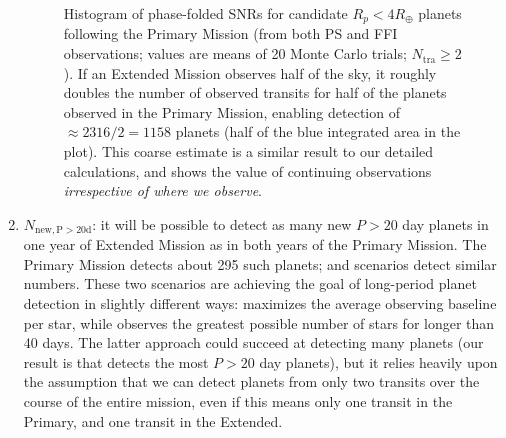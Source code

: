 \begin{enumerate}
\begin{figure}[!t]
	\caption{Histogram of phase-folded SNRs for candidate $R_p<4R_\oplus$ planets following the Primary Mission (from both PS and FFI observations; values are means of 20 Monte Carlo trials; $N_\mathrm{tra}\geq2$).
	If an Extended Mission observes half of the sky, it roughly doubles the number of observed transits for half of the planets observed in the Primary Mission, enabling detection of $\approx 2316/2 = 1158$ planets (half of the blue integrated area in the plot). This coarse estimate is a similar result to our detailed calculations, and shows the value of continuing \tesss observations \textit{irrespective of where we observe}.}
	\label{fig:snrf_histogram}
\end{figure}

	\item $N_\mathrm{new,P>20d}$: it will be possible to detect as many new $P>20$ day planets in one year of \tesss Extended Mission as in both years of the Primary Mission.
	The Primary Mission detects about 295 such planets; \hemis\:and 
	\npole\:scenarios detect similar numbers.
	These two scenarios are achieving the goal of long-period planet detection in slightly different ways: %
	\npole\:maximizes the average observing baseline per star, while \hemis\:observes the greatest possible number of stars for longer than 40 days.
	The latter approach could succeed at detecting many planets (our result is that \hemis\:detects the most $P>20$ day planets), but it relies heavily upon the assumption that we can detect planets from only two transits over the course of the entire mission, even if this means only one transit in the Primary, and one transit in the Extended.


\end{enumerate}
